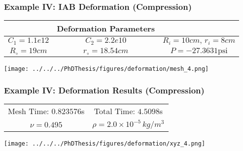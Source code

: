 \begin{frame}
\frametitle{Example IV: IAB Deformation (Compression)}
\centering
\begin{tabular}{@{}c@{}c@{}c@{}}
	\toprule
	& Deformation Parameters & \\
	\midrule
	$C_1=1.1e12$ &  $C_2 = 2.2e10$ & $R_i = 10cm, \, r_i = 8cm$ \\
	$R_\circ = 19 cm$ & $r_\circ = 18.54 cm$ & $P = -27.3631 \text{psi}$ 
	\\
	\midrule
	\bottomrule
\end{tabular}
%
\centering
\texttt{[image: ../../../PhDThesis/figures/deformation/mesh\_4.png]}
\centering 
\end{frame}


\begin{frame}
\frametitle{Example IV: Deformation Results (Compression)}
\centering
\begin{tabular}{@{}c|@{}|c@{}}
\toprule
\midrule 
Mesh Time: $0.823576$s  & Total Time: $4.5098$s \\
%
$\nu=0.495$  &  $\rho = 2.0\times 10^{-5} \,kg/m^3$ 
%
\\
\midrule
\bottomrule
\end{tabular}
\texttt{[image: ../../../PhDThesis/figures/deformation/xyz\_4.png]}
\end{frame}